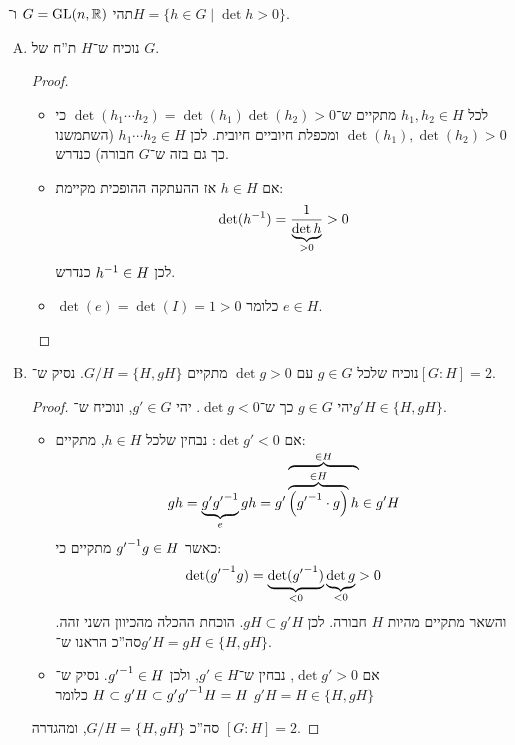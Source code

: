 \documentclass[]{../../../../../tex/classes/homework}
\newcommand\GL{\gGL}
\begin{document}
	\section{}
	תהי $G =\GL(n, \R)$ ו־$H = \{h \in G \mid \det h > 0\}$. 
	\begin{enumerate}[(A)]
		\item נוכיח ש־$H$ ת''ח של $G$. \begin{proof}
			\begin{itemize}
				\item לכל $h_1, h_2 \in H$ מתקיים ש־$\det(h_1\cdots h_2) = \det(h_1)\det(h_2) > 0$ כי $\det(h_1), \det(h_2) > 0$ ומכפלת חיוביים חיובית. לכן $h_1 \cdots h_2 \in H$ (השתמשנו כך גם בזה ש־$G$ חבורה) כנדרש. 
				\item אם $h \in H$ אז ההעתקה ההופכית מקיימת: 
				\[ \det(h^{-1}) = \frac{1}{\underbrace{\det h}_{> 0}} > 0 \]
				לכן $h^{-1} \in H$ כנדרש. 
				\item $\det(e) = \det(I) = 1 > 0$ כלומר $e \in H$. 
			\end{itemize}
		\end{proof}
		\item נוכיח שלכל $g \in G$ עם $\det g > 0$ מתקיים $G/H = \{H, gH\}$. נסיק ש־$[G: H] = 2$. \begin{proof}
			יהי $g \in G$ כך ש־$\det g < 0$. יהי $g' \in G$, ונוכיח ש־$g'H \in \{H, gH\}$. 
			\begin{itemize}
				\item אם $\det g' < 0$: נבחין שלכל $h \in H$, מתקיים: 
				\[ gh = \underbrace{g' {g'}^{-1}}_{e} g h = g' \overbrace{\overbrace{\left ( {g'}^{-1} \cdot g \right )}^{\in H}h}^{\smash{\in H}} \in g'H \]
				כאשר ${g'}^{-1} g \in H$ מתקיים כי: 
				\[ \det({g'}^{-1} g) = \underbrace{\det({g'}^{-1})}_{<0} \underbrace{\det g}_{<0} > 0 \]
				והשאר מתקיים מהיות $H$ חבורה. לכן $gH \subset g'H$. הוכחת ההכלה מהכיוון השני זהה. סה''כ הראנו ש־$g'H = gH \in \{H, gH\}$. 
				\item אם $\det g'> 0$, נבחין ש־$g' \in H$, ולכן ${g'}^{-1} \in H$. נסיק ש־$H \subset g'H \subset g'{g'}^{-1} H = H$ כלומר $g'H = H \in \{H, gH\}$
			\end{itemize}
			סה''כ $G/H = \{H, gH\}$, ומהגדרה $[G : H] = 2$. 
		\end{proof}
	\end{enumerate}
	
\end{document}

